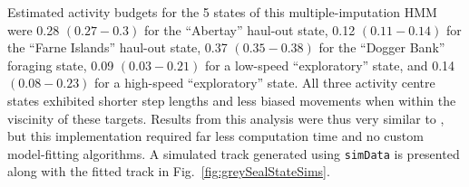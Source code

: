 \documentclass[12pt]{article}\usepackage[]{graphicx}\usepackage[]{color}
\begin{document}
Estimated activity budgets for the 5 states of this multiple-imputation HMM were 0.28 $(0.27-0.3)$ for the ``Abertay'' haul-out state, 0.12 $(0.11-0.14)$ for the ``Farne Islands'' haul-out state, 0.37 $(0.35-0.38)$ for the ``Dogger Bank'' foraging state, 0.09 $(0.03-0.21)$ for a low-speed ``exploratory'' state, and 0.14 $(0.08-0.23)$ for a high-speed ``exploratory'' state. All three activity centre states exhibited shorter step lengths and less biased movements when within the viscinity of these targets. Results from this analysis were thus very similar to \cite{McClintockEtAl2012}, but this implementation required far less computation time and no custom model-fitting algorithms. A simulated track generated using \verb|simData| is presented along with the fitted track in Fig.\ \ref{fig:greySealStateSims}.%
\end{document}
